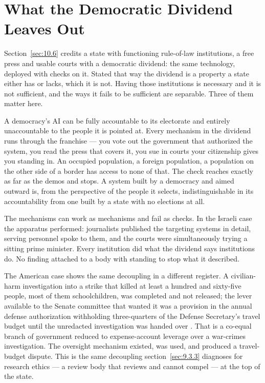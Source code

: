 \section{What the Democratic Dividend Leaves Out}
\label{sec:10.10}
Section~\ref{sec:10.6} credits a state with functioning rule-of-law institutions, a free press and usable courts with a democratic dividend: the same technology, deployed with checks on it. Stated that way the dividend is a property a state either has or lacks, which it is not. Having those institutions is necessary and it is not sufficient, and the ways it fails to be sufficient are separable. Three of them matter here.

A democracy's AI can be fully accountable to its electorate and entirely unaccountable to the people it is pointed at. Every mechanism in the dividend runs through the franchise — you vote out the government that authorized the system, you read the press that covers it, you sue in courts your citizenship gives you standing in. An occupied population, a foreign population, a population on the other side of a border has access to none of that. The check reaches exactly as far as the demos and stops. A system built by a democracy and aimed outward is, from the perspective of the people it selects, indistinguishable in its accountability from one built by a state with no elections at all.

The mechanisms can work as mechanisms and fail as checks. In the Israeli case the apparatus performed: journalists published the targeting systems in detail, serving personnel spoke to them, and the courts were simultaneously trying a sitting prime minister. Every institution did what the dividend says institutions do. No finding attached to a body with standing to stop what it described.

The American case shows the same decoupling in a different register. A civilian-harm investigation into a strike that killed at least a hundred and sixty-five people, most of them schoolchildren, was completed and not released; the lever available to the Senate committee that wanted it was a provision in the annual defense authorization withholding three-quarters of the Defense Secretary's travel budget until the unredacted investigation was handed over \autocite{stassis2026senate}. That is a co-equal branch of government reduced to expense-account leverage over a war-crimes investigation. The oversight mechanism existed, was used, and produced a travel-budget dispute. This is the same decoupling section~\ref{sec:9.3.3} diagnoses for research ethics — a review body that reviews and cannot compel — at the top of the state.

